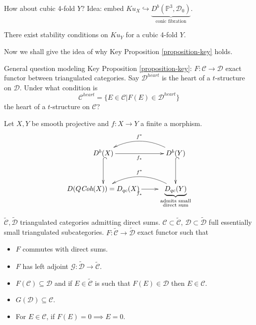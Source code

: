 \begin{example}
\label{example-cubic-4-fold}
How about cubic 4-fold $Y$? Idea: embed 
$Ku_X\hookrightarrow \underbrace{D^b(\mathbb{P}^3,\mathcal{D}_0)}
_{\text{conic fibration}}$.
\end{example}

\begin{theorem}
\label{theorem-exists-SC-for-cubic-4-fold}
There exist stability conditions on $Ku_Y$  for a cubic 4-fold $Y$.
\end{theorem}

\medskip\noindent
Now we shall give the idea of why Key Proposition \ref{proposition-key} holds.

General question modeling Key Proposition \ref{proposition-key}: 
$F: \mathcal{C} \to \mathcal{D}$ exact functor between triangulated categories.
Say $\mathcal{D}^{heart}$ is the heart of a $t$-structure on $\mathcal{D}$. 
Under what condition is
$$
\mathcal{C}^{heart}=\{E \in \mathcal{C}|F(E) \in \mathcal{D}^{heart}\}
$$
the heart of a $t$-structure on $\mathcal{C}$?

\begin{example}
\label{example-}
Let $X,Y$ be smooth projective and $f:X \to Y$ a finite a morphism.
$$
\xymatrix{
D^b(X)\ar[r]_{f_*} \ar@{^{(}->}[d]
&D^b(Y) \ar@/_{1.5pc}/[l]_{f^*}\ar@{^{(}->}[d]\\
D(Q\textit{Coh}(X))=D_{qc}(X)\ar[r]_{f_*}
&\underbrace{D_{qc}(Y)}_{\substack{\text{admits small} \\ \text{direct sum}}}
\ar@/_{1.5pc}/[l]_{f^*}
}
$$
\end{example}

\begin{situation}
\label{situation-}
$\tilde{\mathcal{C}},\tilde{\mathcal{D}}$ 
triangulated categories admitting direct sums. 
$\mathcal{C}\subset \tilde{\mathcal{C}}$, 
$\mathcal{D} \subset\tilde{\mathcal{D}}$ 
full essentially small triangulated subcategories. 
$F:\tilde{\mathcal{C}}\to \tilde{\mathcal{D}}$ exact functor such that
\begin{itemize}
\item $F$ commutes with direct sums.
\item $F$ has left adjoint 
$\mathcal{G}:\tilde{\mathcal{D}}\to \tilde{\mathcal{C}}$.
\item $F(\mathcal{C}) \subseteq \mathcal{D}$ and if $E \in \tilde{\mathcal{C}}$
is such that $F(E) \in \mathcal{D}$ then $E \in \mathcal{C}$.
\item $G(\mathcal{D}) \subseteq \mathcal{ C}$.
\item For $E \in \mathcal{C}$, if $F(E)=0 \implies E=0$.
\end{itemize}
\end{situation}


